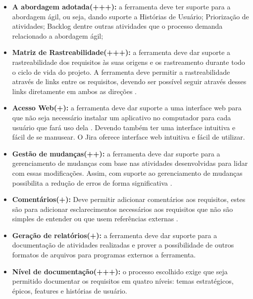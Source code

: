 \begin{itemize}
    \item \textbf{A abordagem adotada(+++):} a ferramenta deve ter suporte para a abordagem ágil, ou seja, dando suporte a Histórias de Usuário; Priorização de atividades; Backlog dentre outras atividades que o processo demanda relacionado a abordagem ágil;     
    \item \textbf{Matriz de Rastreabilidade(+++):} a ferramenta deve dar suporte a rastreabilidade dos requisitos às suas origens e os rastreamento durante todo o ciclo de vida do projeto. A ferramenta deve permitir a rastreabilidade através de links entre os requisitos, devendo ser possível seguir através desses links diretamente em ambos as direções \cite{hoffmann2004}.     
    \item \textbf{Acesso Web(+):} a ferramenta deve dar suporte a uma interface web para que não seja necessário instalar um aplicativo no computador para cada usuário que fará uso dela \cite{hoffmann2004}. Devendo também ter uma interface intuitiva e fácil de se manusear. O Jira oferece interface web intuitiva e fácil de utilizar.
    \item \textbf{Gestão de mudanças(++):} a ferramenta deve dar suporte para a gerenciamento de mudanças com base nas atividades desenvolvidas para lidar com essas modificações. Assim, com suporte ao gerenciamento de mudanças possibilita a redução de erros de forma significativa \cite{hoffmann2004}.
    \item \textbf{Comentários(+):} Deve permitir adicionar comentários aos requisitos, estes são para adicionar esclarecimentos necessários aos requisitos que não são simples de entender ou que usem referências externas \cite{hoffmann2004}.
    \item \textbf{Geração de relatórios(+):} a ferramenta deve dar suporte para a documentação de atividades realizadas e  prover a possibilidade de outros formatos de arquivos para programas externos a ferramenta.
    \item \textbf{Nível de documentação(+++):} o processo escolhido exige que seja permitido documentar os requisitos em quatro níveis: temas estratégicos, épicos, features e histórias de usuário.
\end{itemize}

